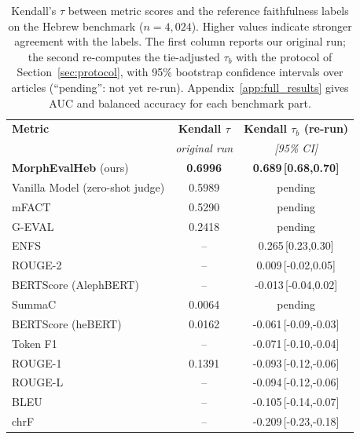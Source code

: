\begin{table}[t]
\centering
\small
\setlength{\tabcolsep}{4pt}
\begin{tabular}{lcc}
\toprule
\textbf{Metric} & \textbf{Kendall $\tau$} & \textbf{Kendall $\tau_b$ (re-run)} \\
 & \textit{original run} & \textit{[95\% CI]} \\
\midrule
\textbf{MorphEvalHeb} (ours) & \textbf{0.6996} & \textbf{0.689\,{\scriptsize[0.68,0.70]}} \\
\midrule
Vanilla Model (zero-shot judge) & 0.5989 & pending \\
mFACT & 0.5290 & pending \\
G-EVAL & 0.2418 & pending \\
ENFS & -- & 0.265\,{\scriptsize[0.23,0.30]} \\
ROUGE-2 & -- & 0.009\,{\scriptsize[-0.02,0.05]} \\
BERTScore (AlephBERT) & -- & -0.013\,{\scriptsize[-0.04,0.02]} \\
SummaC & 0.0064 & pending \\
BERTScore (heBERT) & 0.0162 & -0.061\,{\scriptsize[-0.09,-0.03]} \\
Token F1 & -- & -0.071\,{\scriptsize[-0.10,-0.04]} \\
ROUGE-1 & 0.1391 & -0.093\,{\scriptsize[-0.12,-0.06]} \\
ROUGE-L & -- & -0.094\,{\scriptsize[-0.12,-0.06]} \\
BLEU & -- & -0.105\,{\scriptsize[-0.14,-0.07]} \\
chrF & -- & -0.209\,{\scriptsize[-0.23,-0.18]} \\
\bottomrule
\end{tabular}
\caption{Kendall's $\tau$ between metric scores and the reference faithfulness labels on the Hebrew benchmark ($n{=}4{,}024$). Higher values indicate stronger agreement with the labels. The first column reports our original run; the second re-computes the tie-adjusted $\tau_b$ with the protocol of Section~\ref{sec:protocol}, with 95\% bootstrap confidence intervals over articles (``pending'': not yet re-run). Appendix~\ref{app:full_results} gives AUC and balanced accuracy for each benchmark part.}
\label{tab:main_results}
\end{table}
